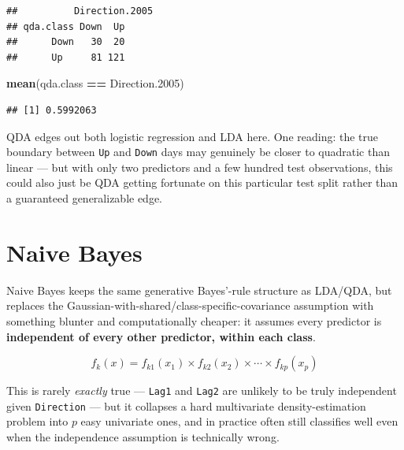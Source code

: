 \documentclass[
  11pt,
]{article}
\newenvironment{Shaded}{\begin{snugshade}}{\end{snugshade}}
\newcommand{\FloatTok}[1]{\textcolor[rgb]{0.00,0.00,0.81}{#1}}
\newcommand{\FunctionTok}[1]{\textcolor[rgb]{0.13,0.29,0.53}{\textbf{#1}}}
\newcommand{\NormalTok}[1]{#1}
\newcommand{\OtherTok}[1]{\textcolor[rgb]{0.56,0.35,0.01}{#1}}
\newcommand{\SpecialCharTok}[1]{\textcolor[rgb]{0.81,0.36,0.00}{\textbf{#1}}}
\begin{document}
\begin{Shaded}
\end{Shaded}

\begin{verbatim}
##          Direction.2005
## qda.class Down  Up
##      Down   30  20
##      Up     81 121
\end{verbatim}

\begin{Shaded}
\begin{Highlighting}[]
\FunctionTok{mean}\NormalTok{(qda.class }\SpecialCharTok{==}\NormalTok{ Direction}\FloatTok{.2005}\NormalTok{)}
\end{Highlighting}
\end{Shaded}

\begin{verbatim}
## [1] 0.5992063
\end{verbatim}

QDA edges out both logistic regression and LDA here. One reading: the
true boundary between \texttt{Up} and \texttt{Down} days may genuinely
be closer to quadratic than linear --- but with only two predictors and
a few hundred test observations, this could also just be QDA getting
fortunate on this particular test split rather than a guaranteed
generalizable edge.

\section{Naive Bayes}\label{naive-bayes}

Naive Bayes keeps the same generative Bayes'-rule structure as LDA/QDA,
but replaces the Gaussian-with-shared/class-specific-covariance
assumption with something blunter and computationally cheaper: it
assumes every predictor is \textbf{independent of every other predictor,
within each class}.

\[
f_k(x) = f_{k1}(x_1) \times f_{k2}(x_2) \times \cdots \times f_{kp}(x_p)
\]

This is rarely \emph{exactly} true --- \texttt{Lag1} and \texttt{Lag2}
are unlikely to be truly independent given \texttt{Direction} --- but it
collapses a hard multivariate density-estimation problem into \(p\) easy
univariate ones, and in practice often still classifies well even when
the independence assumption is technically wrong.
\end{document}

